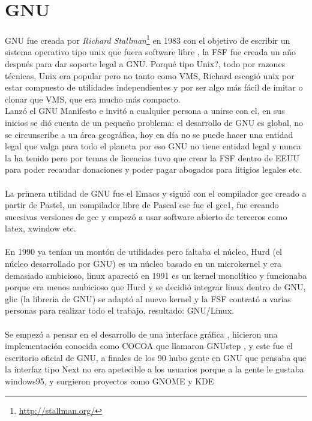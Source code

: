 \documentclass[a4paper,oneside,11pt]{article}
\begin{document}
\section{GNU}

GNU fue creada por \emph{Richard Stallman}\footnote{\url{http://stallman.org/}} en 1983 con el objetivo de escribir un sistema operativo tipo unix que fuera software libre , la FSF fue 
creada un año despu\'es para dar soporte legal a GNU. Porqu\'e tipo Unix?, todo por razones t\'ecnicas,
 Unix era popular pero no tanto como VMS,  Richard escogi\'o unix por estar compuesto de utilidades
  independientes y por ser algo m\'as f\'acil de imitar o clonar que VMS, que era mucho m\'as compacto.
\\    
Lanz\'o el GNU Manifesto e invit\'o a cualquier persona a unirse con el, en sus inicios se di\'o cuenta de un pequeño problema: el desarrollo
 de GNU es global, no se circunscribe a un \'area geogr\'afica, hoy en d\'ia no se puede hacer una entidad legal que
  valga para todo el planeta por eso GNU no tiene entidad legal y nunca la ha tenido pero por temas de licencias
   tuvo que crear la FSF dentro de EEUU para poder recaudar donaciones y poder pagar abogados para litigios 
   legales etc.\\
\\
La primera utilidad de GNU fue el Emacs y sigui\'o con el compilador gcc creado a partir de Pastel, un compilador 
libre de Pascal ese fue el gcc1, fue creando sucesivas versiones de gcc y empez\'o a usar software abierto de terceros como latex, xwindow etc.\\
\\
En 1990 ya ten\'ian un mont\'on de utilidades pero faltaba el n\'ucleo, Hurd (el n\'ucleo desarrollado por GNU) es un n\'ucleo basado en un
 microkernel y era demasiado ambicioso, linux apareci\'o en 1991 es un kernel monol\'itico y funcionaba porque 
 era menos ambicioso que Hurd y se decidi\'o integrar linux dentro de GNU, glic (la libreria de GNU) se adapt\'o al nuevo kernel 
 y la FSF contrat\'o a varias personas para realizar todo el trabajo, resultado: GNU/Linux.
\\\\
Se empez\'o a pensar en el desarrollo de una interface gr\'afica , hicieron una
     implementaci\'on conocida como COCOA que llamaron GNUstep , y este fue el escritorio oficial
      de GNU, a finales de los 90 hubo gente en GNU que pensaba que la interfaz tipo Next no era
       apetecible a los usuarios porque a la gente le gustaba windows95,  y surgieron proyectos como GNOME y KDE
\end{document}
